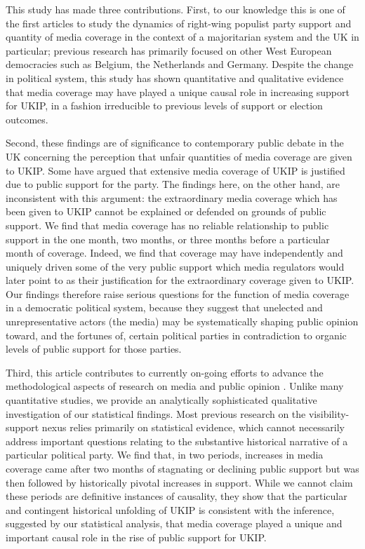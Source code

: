 \documentclass[12pt,]{article}
\begin{document}
This study has made three contributions. First, to our knowledge this is
one of the first articles to study the dynamics of right-wing populist
party support and quantity of media coverage in the context of a
majoritarian system and the UK in particular; previous research has
primarily focused on other West European democracies such as Belgium,
the Netherlands and Germany. Despite the change in political system,
this study has shown quantitative and qualitative evidence that media
coverage may have played a unique causal role in increasing support for
UKIP, in a fashion irreducible to previous levels of support or election
outcomes.

Second, these findings are of significance to contemporary public debate
in the UK concerning the perception that unfair quantities of media
coverage are given to UKIP. Some have argued that extensive media
coverage of UKIP is justified due to public support for the party. The
findings here, on the other hand, are inconsistent with this argument:
the extraordinary media coverage which has been given to UKIP cannot be
explained or defended on grounds of public support. We find that media
coverage has no reliable relationship to public support in the one
month, two months, or three months before a particular month of
coverage. Indeed, we find that coverage may have independently and
uniquely driven some of the very public support which media regulators
would later point to as their justification for the extraordinary
coverage given to UKIP. Our findings therefore raise serious questions
for the function of media coverage in a democratic political system,
because they suggest that unelected and unrepresentative actors (the
media) may be systematically shaping public opinion toward, and the
fortunes of, certain political parties in contradiction to organic
levels of public support for those parties.

Third, this article contributes to currently on-going efforts to advance
the methodological aspects of research on media and public opinion
\citep{Vliegenthart:2014di}. Unlike many quantitative studies, we
provide an analytically sophisticated qualitative investigation of our
statistical findings. Most previous research on the visibility-support
nexus relies primarily on statistical evidence, which cannot necessarily
address important questions relating to the substantive historical
narrative of a particular political party. We find that, in two periods,
increases in media coverage came after two months of stagnating or
declining public support but was then followed by historically pivotal
increases in support. While we cannot claim these periods are definitive
instances of causality, they show that the particular and contingent
historical unfolding of UKIP is consistent with the inference, suggested
by our statistical analysis, that media coverage played a unique and
important causal role in the rise of public support for UKIP.
\end{document}
